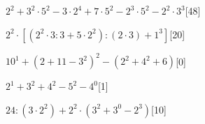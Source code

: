 \begin{esercizio} \label{ese:1.17}
$2^2+3^2\cdot5^2-3\cdot2^4+7\cdot5^2-2^3\cdot5^2-2^2\cdot3^3$\hfill[48]
\end{esercizio}
\begin{esercizio} \label{ese:1.17}
$2^2\cdot[(2^2\cdot3:3+5\cdot2^2):(2\cdot3)+1^3]$\hfill[20]
\end{esercizio}
\begin{esercizio} \label{ese:1.17}
$10^1+(2+11-3^2)^2-(2^2+4^2+6)$\hfill[0]
\end{esercizio}
\begin{esercizio} \label{ese:1.17}
$2^1+3^2+4^2-5^2-4^0$\hfill[1]
\end{esercizio}
\begin{esercizio} \label{ese:1.17}
$24:(3\cdot2^2)+2^2\cdot(3^2+3^0-2^3)$\hfill[10]
\end{esercizio}
